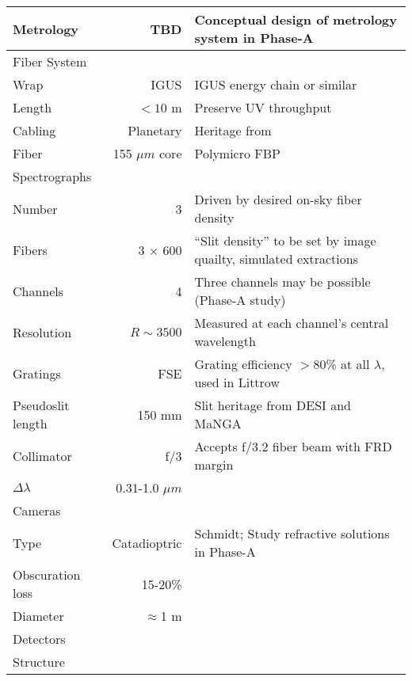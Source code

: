 \begin{table}[h!]
\begin{tabular}{l r l}
\hspace{0.2cm} Metrology & TBD & Conceptual design of metrology system in Phase-A \\
\hline
Fiber System \\
\hline
\hspace{0.2cm} Wrap & IGUS & IGUS energy chain or similar \citep[e.g.,][]{poppett16}  \\
\hspace{0.2cm} Length & $<10$ m & Preserve UV throughput  \\
\hspace{0.2cm} Cabling & Planetary & Heritage from \citet{soukup10}  \\
\hspace{0.2cm} Fiber & 155 $\mu m$ core & Polymicro FBP \\
\hline
Spectrographs \\
\hline
\hspace{0.2cm} Number & 3 & Driven by desired on-sky fiber density \\
\hspace{0.2cm} Fibers & 3 $\times$ 600 & ``Slit density'' to be set by image quailty, simulated extractions \\
\hspace{0.2cm} Channels & 4 & Three channels may be possible (Phase-A study) \\
\hspace{0.2cm} Resolution & $R \sim 3500$ & Measured at each channel's central wavelength \\
\hspace{0.2cm} Gratings & FSE & Grating efficiency $>$80\% at all $\lambda$, used in Littrow \\
\hspace{0.2cm} Pseudoslit length & 150 mm & Slit heritage from DESI and MaNGA \\
\hspace{0.2cm} Collimator & f/3 & Accepts f/3.2 fiber beam with FRD margin \\
\hspace{0.2cm} $\Delta\lambda$ & 0.31-1.0 $\mu m$ &  \\
\hspace{0.2cm} Cameras &  &  \\
\hspace{0.3cm} Type & Catadioptric & Schmidt; Study refractive solutions in Phase-A \\
\hspace{0.3cm} Obscuration loss & 15-20\% &  \\
\hspace{0.3cm} Diameter & $\approx$1 m &  \\
\hline
Detectors \\
\hline
\hline
Structure \\
\hline
\hline



\end{tabular}
\end{table}


